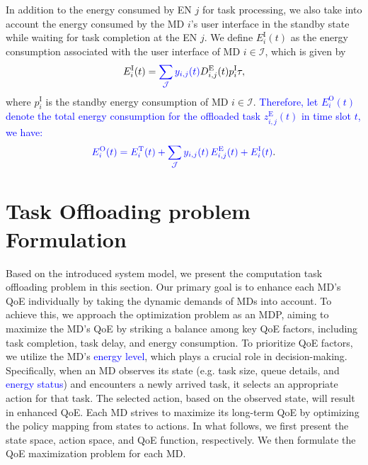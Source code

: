 \documentclass[10pt, journal,letterpaper]{IEEEtran}
\begin{document}
In addition to the energy consumed by EN $j$ for task processing, we also take into account the energy consumed by the MD $i$'s user interface in the standby state while waiting for task completion at the EN $j$. We define $E_{i}^{\text{I}}(t)$ as the energy consumption associated with the user interface of MD $i \in \mathcal{I}$, which is given by
\begin{alignat}{1}
	E_{i}^{\text{I}}(t) =  \textcolor{blue}{\sum_{\mathcal{J}}y_{i,j}(t)} D_{i,j}^{\text{E}}(t) p_i^{\text{I}} \tau, %
	\label{16}
\end{alignat}
where $p_i^{\text{I}}$ is the standby energy consumption of MD $i \in \mathcal{I}$.
\textcolor{blue}{Therefore, let $E_i^{\text{O}}(t)$ denote the total energy consumption for the offloaded task $z_{i,j}^{\text{E}}(t)$ in time slot $t$, we have:}
\begin{alignat}{1}
	\textcolor{blue}{E_i^{\text{O}}(t) = E_i^{\text{T}}(t) +  \textcolor{blue}{\sum_{\mathcal{J}}y_{i,j}(t) \,} E_{i,j}^{\text{E}}(t) + E_i^{\text{I}}(t)}.
	\label{17}
\end{alignat}




\section{Task Offloading problem Formulation}
\label{section:IV}

Based on the introduced system model, we present the computation task offloading problem in this section. Our primary goal is to enhance each MD's QoE individually by taking the dynamic demands of MDs into account. To achieve this, we approach the optimization problem as an MDP, aiming to maximize the MD's QoE by striking a balance among key QoE factors, including task completion, task delay, and energy consumption. To prioritize QoE factors, we utilize the MD's \textcolor{blue}{energy level}, which plays a crucial role in decision-making. Specifically, when an MD observes its state (e.g. task size, queue details, and \textcolor{blue}{energy status}) and encounters a newly arrived task, it selects an appropriate action for that task. The selected action, based on the observed state, will result in enhanced QoE. Each MD strives to maximize its long-term QoE by optimizing the policy mapping from states to actions. In what follows, we first present the state space, action space, and QoE function, respectively. We then formulate the QoE maximization problem for each MD.
\end{document}
